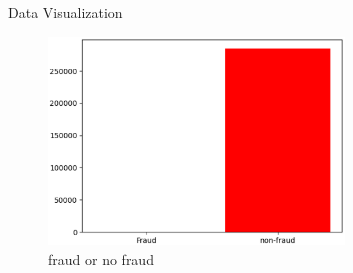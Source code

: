 \documentclass[
 size=14pt,
 paper=smartboard,  %
 mode=present, 		%
 display=slides, 	%
 style=tuliplab,  	%
 pauseslide,
 fleqn,leqno]{powerdot}
\begin{document}
\begin{slide}{Data Visualization}



\begin{figure}[H]
	\centering
	\includegraphics[width=0.7\textwidth]{figures/fraud.eps}
	\caption{fraud or no fraud}
	\label{fig:fraud data}
\end{figure}


\end{slide}
\end{document}
